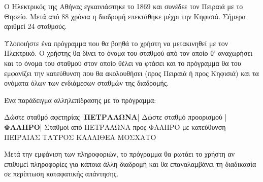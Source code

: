 \documentclass[a4paper,11pt,oneside]{book}
\begin{document}
\begin{exercise}
Ο Ηλεκτρικός της Αθήνας εγκαινιάστηκε το 1869 και συνέδεε τον Πειραιά με το Θησείο. Μετά από 88 χρόνια η διαδρομή επεκτάθηκε μέχρι την Κηφισιά. Σήμερα αριθμεί 24 σταθμούς.

Υλοποιήστε ένα πρόγραμμα που θα βοηθά το χρήστη να μετακινηθεί με τον Ηλεκτρικό. Ο χρήστης θα δίνει το όνομα του σταθμού από τον οποίο θ' αναχωρήσει και το όνομα του σταθμού στον οποίο θέλει να φτάσει και το πρόγραμμα θα του εμφανίζει την κατεύθυνση που θα ακολουθήσει (προς Πειραιά ή προς Κηφισιά) και τα ονόματα όλων των ενδιάμεσων σταθμών της διαδρομής. 

\begin{note}
Ένα παράδειγμα αλληλεπίδρασης με το πρόγραμμα:

\begin{pyterm}
Δώστε σταθμό αφετηρίας
|\textbf{ΠΕΤΡΑΛΩΝΑ}|
Δώστε σταθμό προορισμού
|\textbf{ΦΑΛΗΡΟ}|
Σταθμοί από ΠΕΤΡΑΛΩΝΑ προς ΦΑΛΗΡΟ με κατεύθυνση ΠΕΙΡΑΙΑΣ
ΤΑΥΡΟΣ
ΚΑΛΛΙΘΕΑ
ΜΟΣΧΑΤΟ
\end{pyterm}
\end{note}

Μετά την εμφάνιση των πληροφοριών, το πρόγραμμα θα ρωτάει το χρήστη αν επιθυμεί πληροφορίες για κάποια άλλη διαδρομή και θα επαναλαμβάνει τη διαδικασία σε περίπτωση καταφατικής απάντησης.
\end{exercise}
\end{document}
